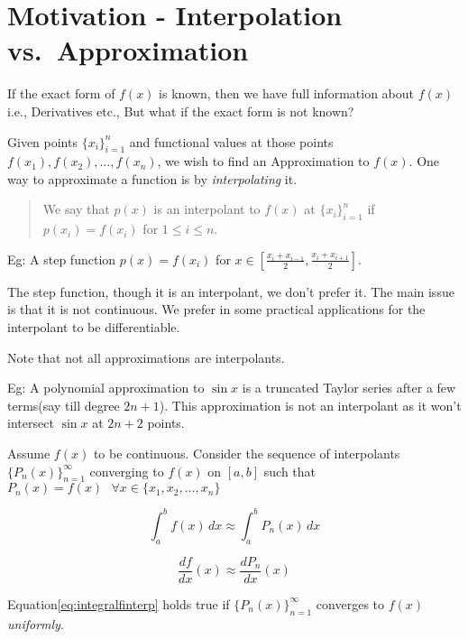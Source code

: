 \documentclass[
]{book}
\begin{document}
\hypertarget{motivation---interpolation-vs.-approximation}{%
\section{Motivation - Interpolation vs.~Approximation}\label{motivation---interpolation-vs.-approximation}}

If the exact form of \(f(x)\) is known, then we have full information about \(f(x)\) i.e., Derivatives etc., But what if the exact form is not known?

Given points \(\{x_i\}_{i=1}^n\) and functional values at those points \(f(x_1),f(x_2), \dots, f(x_n)\), we wish to find an Approximation to \(f(x)\). One way to approximate a function is by \emph{interpolating} it.

\begin{quote}
We say that \(p(x)\) is an interpolant to \(f(x)\) at \(\{x_i\}_{i=1}^n\) if \(p(x_i)= f(x_i)\) for \(1\le i\le n\).
\end{quote}

Eg: A step function \(p(x) = f(x_i)\) for \(x\in \left[ \frac{x_i+x_{i-1}}{2}, \frac{x_i+x_{i+1}}{2} \right]\).

The step function, though it is an interpolant, we don't prefer it. The main issue is that it is not continuous. We prefer in some practical applications for the interpolant to be differentiable.

Note that not all approximations are interpolants.

Eg: A polynomial approximation to \(\sin x\) is a truncated Taylor series after a few terms(say till degree \(2n+1\)). This approximation is not an interpolant as it won't intersect \(\sin x\) at \(2n+2\) points.

Assume \(f(x)\) to be continuous. Consider the sequence of interpolants \(\{P_n(x)\}_{n=1}^{\infty}\) converging to \(f(x)\) on \([a,b]\) such that \(P_n(x)=f(x) \ \  \ \forall x\in \{x_1,x_2,\dots,x_n \}\)

\begin{equation}
\label{eq:integralfinterp}
\int_a^b f(x) \, dx \approx \int_a^b P_n(x) \, dx 
\end{equation}

\begin{equation}
\label{eq:dfdxinterp}
\frac{df}{dx}(x) \approx \frac{dP_n}{dx}(x)
\end{equation}

Equation\eqref{eq:integralfinterp} holds true if \(\{P_n(x)\}_{n=1}^{\infty}\) converges to \(f(x)\) \emph{uniformly}.
\end{document}
